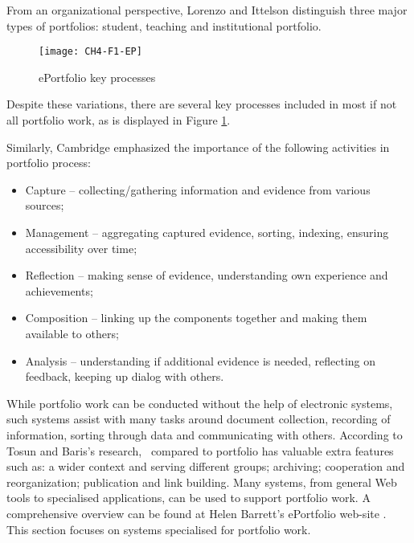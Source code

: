From an organizational perspective, Lorenzo and Ittelson
\citeyearpar{Lorenzo2005} distinguish three major types of portfolios: student,
teaching and institutional portfolio.

\begin{figure}[htb]
\centering
\texttt{[image: CH4-F1-EP]}
\caption[ePortfolio key processes]{ePortfolio key processes \citep{Malloff2010}}
\label{fig:ep}
\end{figure}

Despite these variations, there are several key processes included in most if
not all portfolio work, as is displayed in Figure \ref{fig:ep}.
 
Similarly, Cambridge \citeyearpar{Cambridge2010} emphasized the importance of
the following activities in portfolio process:

\begin{itemize}
  \item Capture -- collecting/gathering information and evidence from various
  sources;
  \item Management -- aggregating captured evidence, sorting, indexing, ensuring
  accessibility over time;
  \item Reflection -- making sense of evidence, understanding own experience and
  achievements;
  \item Composition -- linking up the components together and making them
  available to others;
  \item Analysis -- understanding if additional evidence is needed, reflecting
  on feedback, keeping up dialog with others.
\end{itemize}

While portfolio work can be conducted without the help of electronic systems,
such systems assist with many tasks around document collection, recording of
information, sorting through data and communicating with others. According
to Tosun and Baris's \citeyearpar{Tosun2011} research, \ep~compared to portfolio
has valuable extra features such as: a wider context and serving different
groups; archiving; cooperation and reorganization; publication and link building.
Many systems, from general Web tools to specialised applications, can be used to
support portfolio work. A comprehensive overview can be found at Helen Barrett's
ePortfolio web-site \citep{Barrett2008}. This section focuses on systems
specialised for portfolio work.

